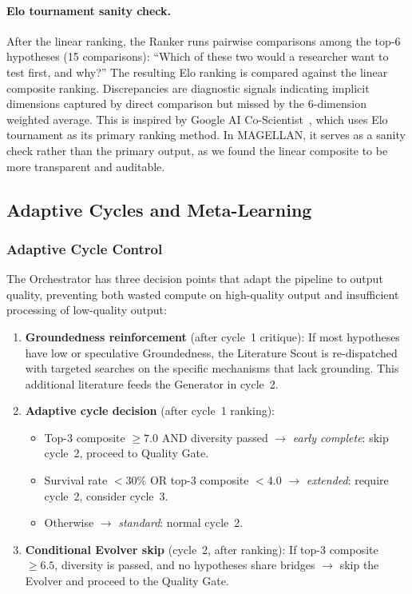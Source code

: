 \paragraph{Elo tournament sanity check.} After the linear ranking, the Ranker runs pairwise comparisons among the top-6 hypotheses (15 comparisons): ``Which of these two would a researcher want to test first, and why?'' The resulting Elo ranking is compared against the linear composite ranking. Discrepancies are diagnostic signals indicating implicit dimensions captured by direct comparison but missed by the 6-dimension weighted average. This is inspired by Google AI Co-Scientist~\citep{gottweis2025}, which uses Elo tournament as its primary ranking method. In MAGELLAN, it serves as a sanity check rather than the primary output, as we found the linear composite to be more transparent and auditable.

\subsection{Adaptive Cycles and Meta-Learning}
\label{sec:adaptive}

\subsubsection{Adaptive Cycle Control}

The Orchestrator has three decision points that adapt the pipeline to output quality, preventing both wasted compute on high-quality output and insufficient processing of low-quality output:

\begin{enumerate}
    \item \textbf{Groundedness reinforcement} (after cycle~1 critique): If most hypotheses have low or speculative Groundedness, the Literature Scout is re-dispatched with targeted searches on the specific mechanisms that lack grounding. This additional literature feeds the Generator in cycle~2.

    \item \textbf{Adaptive cycle decision} (after cycle~1 ranking):
    \begin{itemize}
        \item Top-3 composite $\geq 7.0$ AND diversity passed $\to$ \emph{early complete}: skip cycle~2, proceed to Quality Gate.
        \item Survival rate $< 30\%$ OR top-3 composite $< 4.0$ $\to$ \emph{extended}: require cycle~2, consider cycle~3.
        \item Otherwise $\to$ \emph{standard}: normal cycle~2.
    \end{itemize}

    \item \textbf{Conditional Evolver skip} (cycle~2, after ranking): If top-3 composite $\geq 6.5$, diversity is passed, and no hypotheses share bridges $\to$ skip the Evolver and proceed to the Quality Gate.
\end{enumerate}

